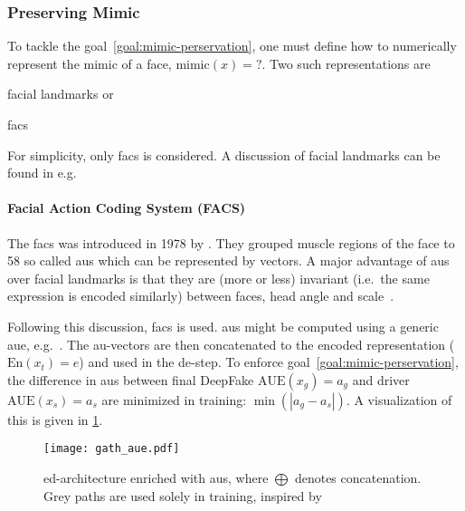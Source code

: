 \subsubsection{Preserving Mimic}
To tackle the goal~\ref{goal:mimic-perservation}, one must define how to
numerically represent the mimic of a face, \(\text{mimic}(x)=\mathord{?}\).
Two such representations are
\begin{enumerate*}[a.)]
    \item facial landmarks or
    \item \gls{facs}
\end{enumerate*}
For simplicity, only \gls{facs} is considered. A discussion of facial landmarks
can be found in e.g.\ \cite{Ha.2020}

\paragraph*{Facial Action Coding System (FACS)}
The \gls{facs} was introduced in 1978 by \textcite{Ekman.1978}. They grouped
muscle regions of the face to 58 so called \glspl{au} which can be represented
by vectors. A major advantage of \glspl{au} over facial landmarks is that they
are (more or less) invariant (i.e.\ the same expression is encoded similarly)
between faces, head angle and scale~\cite{Pham.2018}.

\par
Following this discussion, \gls{facs} is used. \Glspl{au} might be computed using
a generic \gls{aue}, e.g.\ \cite{Senechal.2015}. The \gls{au}-vectors are then
concatenated to the encoded representation (\(\text{En}(x_t)=e\)) and used in
the \gls{de}-step. To enforce goal~\ref{goal:mimic-perservation}, the difference
in \glspl{au} between final DeepFake \(\text{AUE}(x_g)=a_g\) and driver
\(\text{AUE}(x_s)=a_s\) are minimized in training:
\(\min{(\left|a_g-a_s\right|)}\). A visualization of this is given in \cref{fig:gath-aue}.
\begin{figure}[htp]
    \center{}
    \texttt{[image: gath\_aue.pdf]}
    \caption{\gls{ed}-architecture enriched with \glspl{au}, where \(\bigoplus\)
    denotes concatenation. Grey paths are used solely in training, inspired
    by~\cite{Mirsky.2020, Pham.2018}}\label{fig:gath-aue}
\end{figure}

